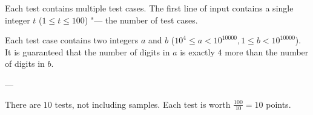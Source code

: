 Each test contains multiple test cases. The first line of input contains a single integer $t$ ($1 \le t \le 100$) "--- the number of test cases.

Each test case contains two integers $a$ and $b$ ($10^4 \le a < 10^{10000}, 1 \le b < 10^{10000}$). It is guaranteed that the number of digits in $a$ is exactly $4$ more than the number of digits in $b$.

---

There are $10$ tests, not including samples. Each test is worth $\frac{100}{10}=10$ points.
